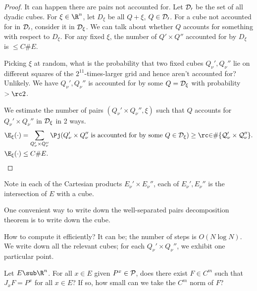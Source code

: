 \begin{proof}


It can happen there are pairs not accounted for. %
Let $\cal D_0$ be the set of all dyadic cubes. For $\xi\in \R^n$, let $D_\xi$ be all $Q+\xi$, $Q\in \cal D_0$. 
For a cube not accounted for in $\cal D_0$, consider it in $\cal D_\xi$. 
We can talk about whether $Q$ accounts for something with respect to $D_\xi$. 
For any fixed $\xi$, the number of $Q'\times Q''$ accounted for by $D_\xi$ is $\le C \#E$. 

Picking $\xi$ at random, what is the probability that two fixed cubes $Q_\nu', Q_\nu''$ lie on different squares of the $2^{11}$-times-larger grid and hence aren't accounted for? Unlikely. %
We have $Q_\nu',Q_\nu''$ is accounted for by some $Q=\cal D_\xi$ with probability $>\rc 2$. 

We estimate the number of 
pairs $(Q_\nu'\times Q_\nu'', \xi)$ such that $Q$ accounts for $Q_\nu'\times Q_\nu''$ in $\cal D_\xi$ in 2 ways.  
\begin{align}
\E_\xi (\cdot) &=  \sum_{Q_\nu'\times Q_\nu''} \Pj(Q_\nu'\times Q_\nu'' \text{ is accounted for by some }Q\in \cal D_\xi) \ge \rc 2\#\{Q_\nu'\times Q_\nu''\}.
\\
\E_\xi(\cdot) &\le C\# E.
\end{align}
\end{proof}
Note in each of the Cartesian products $E_\nu' \times E_\nu''$, each of $E_\nu' ,E_\nu''$ is the intersection of $E$ with a cube. 

One convenient way to write down the well-separated pairs decomposition theorem is to write down the cube.

How to compute it efficiently? It can be; the number of steps is $O(N\log N)$. We write down all the relevant cubes; for each $Q_\nu'\times Q_\nu''$, we exhibit one particular point.



Let $E\sub \R^n$. For all $x\in E$ given $P^x\in \cal P$, does there exist $F\in C^m$ such that $J_x F = P^x$ for all $x\in E$? If so, how small can we take the $C^m$ norm of $F$?

